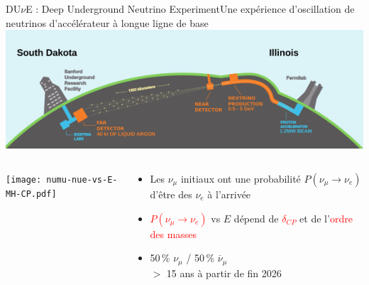     \begin{frame}{DU$\nu$E : Deep Underground Neutrino Experiment}{Une expérience d'oscillation de neutrinos d'accélérateur à longue ligne de base}
        \includegraphics[width=\textwidth]{./pictures/dune.png}\\
        \begin{scriptsize}
        \vspace{0.4cm}
        \begin{columns}
            \begin{column}{0.75\textwidth}
                \texttt{[image: numu-nue-vs-E-MH-CP.pdf]}
            \end{column}
            \hspace{-0.5cm}
            \begin{column}{0.35\textwidth}
                 \begin{itemize}
                     \item Les $\nu_{\mu}$ initiaux ont une probabilité $P(\nu_{\mu}\to\nu_e)$ d'être des $\nu_e$ à l'arrivée
                     \item \textcolor{red}{$P(\nu_{\mu}\to\nu_e)$} vs $E$ dépend de \textcolor{red}{$\delta_{CP}$} et de l'\textcolor{red}{ordre des masses}
                     \item 50\,\% $\nu_{\mu}$ / 50\,\% $\overline{\nu}_{\mu}$ \\ $>$ 15 ans à partir de fin 2026
                 \end{itemize}
            \end{column}
        \end{columns}
        \end{scriptsize}
    \end{frame}
    
